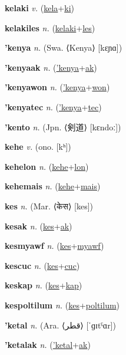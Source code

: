 \textbf{\hypertarget{kelaki}{kelaki}} \textit{v.} (\hyperlink{kela}{kela}+\allowbreak \hyperlink{ki}{ki})


\textbf{\hypertarget{kelakiles}{kelakiles}} \textit{n.} (\hyperlink{kelaki}{kelaki}+\allowbreak \hyperlink{les}{les})


\textbf{\hypertarget{'kenya}{'kenya}} \textit{n.} (Swa. ⟨Kenya⟩ [kɛɲɑ])


\textbf{\hypertarget{'kenyaak}{'kenyaak}} \textit{n.} (\hyperlink{'kenya}{'kenya}+\allowbreak \hyperlink{ak}{ak})


\textbf{\hypertarget{'kenyawon}{'kenyawon}} \textit{n.} (\hyperlink{'kenya}{'kenya}+\allowbreak \hyperlink{won}{won})


\textbf{\hypertarget{'kenyatec}{'kenyatec}} \textit{n.} (\hyperlink{'kenya}{'kenya}+\allowbreak \hyperlink{tec}{tec})


\textbf{\hypertarget{'kento}{'kento}} \textit{n.} (Jpn. ⟨{\japanese{}剣道}⟩ [kɛndoː])


\textbf{\hypertarget{kehe}{kehe}} \textit{v.} (ono. [kʰ])


\textbf{\hypertarget{kehelon}{kehelon}} \textit{n.} (\hyperlink{kehe}{kehe}+\allowbreak \hyperlink{lon}{lon})


\textbf{\hypertarget{kehemais}{kehemais}} \textit{n.} (\hyperlink{kehe}{kehe}+\allowbreak \hyperlink{mais}{mais})


\textbf{\hypertarget{kes}{kes}} \textit{n.} (Mar. ⟨{\devanagari{}केस}⟩ [kes])


\textbf{\hypertarget{kesak}{kesak}} \textit{n.} (\hyperlink{kes}{kes}+\allowbreak \hyperlink{ak}{ak})


\textbf{\hypertarget{kesmyawf}{kesmyawf}} \textit{n.} (\hyperlink{kes}{kes}+\allowbreak \hyperlink{myawf}{myawf})


\textbf{\hypertarget{kescuc}{kescuc}} \textit{n.} (\hyperlink{kes}{kes}+\allowbreak \hyperlink{cuc}{cuc})


\textbf{\hypertarget{keskap}{keskap}} \textit{n.} (\hyperlink{kes}{kes}+\allowbreak \hyperlink{kap}{kap})


\textbf{\hypertarget{kespoltilum}{kespoltilum}} \textit{n.} (\hyperlink{kes}{kes}+\allowbreak \hyperlink{poltilum}{poltilum})


\textbf{\hypertarget{'ketal}{'ketal}} \textit{n.} (Ara. ⟨{\arabics{}قطر‎}⟩ [ˈɡɪtˤɑr])


\textbf{\hypertarget{'ketalak}{'ketalak}} \textit{n.} (\hyperlink{'ketal}{'ketal}+\allowbreak \hyperlink{ak}{ak})


